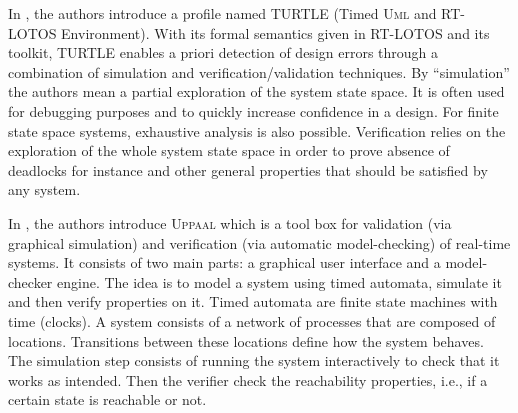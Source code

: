 \documentclass[a4paper,twoside]{article}
\def\sysml{\textsc{SysML}}
\def\UML{\textsc{Uml}}
\def\uml{\textsc{Uml}}
\def\uppaal{\textsc{Uppaal}}
\begin{document}
In \cite{test11}, the authors introduce a profile named TURTLE (Timed \UML{} and RT-LOTOS Environment). With its formal semantics given in RT-LOTOS and its toolkit, TURTLE enables a priori detection of design errors through a combination of simulation and verification/validation techniques. By “simulation” the authors mean a partial exploration of the system state space. It is often used for debugging purposes and to quickly increase confidence in a design. For finite state space systems, exhaustive analysis is also possible. Verification relies 
on the exploration of the whole system state space in order to prove absence of deadlocks for instance and other general properties that should be satisfied by any system.


In \cite{test12}, the authors introduce \uppaal{} which is a tool box for validation (via graphical simulation) and verification (via automatic model-checking) of real-time systems. It consists of two main parts: a graphical user interface and a model-checker engine. The idea is to model a system using timed automata, simulate it and then verify properties on it. Timed automata are finite state machines with time (clocks). A system consists of a network of processes that are composed of locations. Transitions between these locations define how the system behaves. The simulation step consists of running the system interactively to check that it works as intended. Then the verifier check the reachability properties, i.e., if a certain state is reachable or not. 




\end{document}
